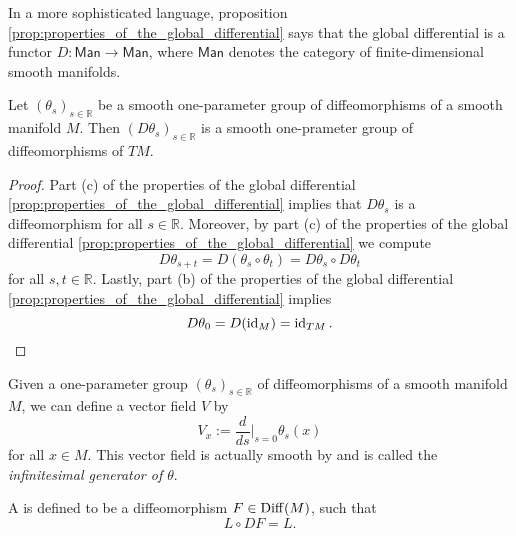 \begin{remark}
	In a more sophisticated language, proposition \ref{prop:properties_of_the_global_differential} says that the global differential is a functor $D : \mathsf{Man} \to \mathsf{Man}$, where $\mathsf{Man}$ denotes the category of finite-dimensional smooth manifolds.
\end{remark}

\begin{lemma}
	\label{lem:induced_one-parameter_group_of_diffeomorphisms}
	Let $(\theta_s)_{s \in \mathbb{R}}$ be a smooth one-parameter group of diffeomorphisms of a smooth manifold $M$. Then $(D\theta_s)_{s \in \mathbb{R}}$ is a smooth one-prameter group of diffeomorphisms of $TM$.
\end{lemma}

\begin{proof}
	Part (c) of the properties of the global differential \ref{prop:properties_of_the_global_differential} implies that $D\theta_s$ is a diffeomorphism for all $s \in \mathbb{R}$. Moreover, by part (c) of the properties of the global differential \ref{prop:properties_of_the_global_differential} we compute
	\begin{equation*}
		D\theta_{s + t} = D(\theta_s \circ \theta_t) = D\theta_s \circ D\theta_t
	\end{equation*}
	\noindent for all $s,t \in \mathbb{R}$. Lastly, part (b) of the properties of the global differential \ref{prop:properties_of_the_global_differential} implies
	\begin{equation*}
		D\theta_0 = D(\operatorname{id}_M) = \operatorname{id}_{TM}.
	\end{equation*}
\end{proof}

Given a one-parameter group $(\theta_s)_{s \in \mathbb{R}}$ of diffeomorphisms of a smooth manifold $M$, we can define a vector field $V$ by
\begin{equation*}
	V_x := \frac{d}{ds}\bigg\vert_{s = 0} \theta_s(x)
\end{equation*}
\noindent for all $x \in M$. This vector field is actually smooth by \cite[210]{lee:smooth_manifolds:2013} and is called the \emph{infinitesimal generator of $\theta$}.

\begin{definition}[Symmetry]
	A  is defined to be a diffeomorphism $F \in \operatorname{Diff}(M)$, such that
	\begin{equation*}
		L \circ DF = L.
	\end{equation*}
\end{definition}

